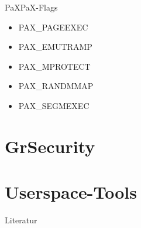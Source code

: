 \begin{frame}{PaX}{PaX-Flags}
    \begin{itemize}
        \item PAX\_PAGEEXEC
        \item PAX\_EMUTRAMP
        \item PAX\_MPROTECT
        \item PAX\_RANDMMAP
        \item PAX\_SEGMEXEC
    \end{itemize}
\end{frame}

\section{GrSecurity}

\section{Userspace-Tools}

\begin{frame}{Literatur}
    
    
\end{frame}


